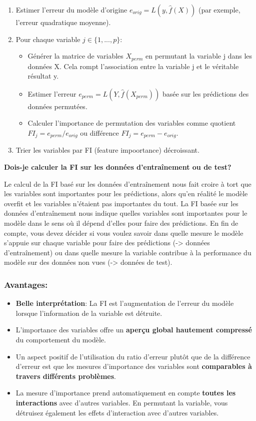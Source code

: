 \begin{enumerate}
    \item Estimer l'erreur du modèle d'origine $e_{orig} = L(y, \hat{f}(X))$  (par exemple, l'erreur quadratique moyenne).
    \item Pour chaque variable $j \in \{1,...,p\}$:
    \begin{itemize}
        \item Générer la matrice de variables $X_{perm}$ en permutant la variable j dans les données X. Cela rompt l'association entre la variable j et le véritable résultat y.
        \item Estimer l'erreur $e_{perm} = L(Y,\hat{f}(X_{perm}))$ basée sur les prédictions des données permutées.
        \item Calculer l'importance de permutation des variables comme quotient $FI_j= e_{perm}/e_{orig}$ ou différence $FI_j = e_{perm}- e_{orig}$.
    \end{itemize}
    \item Trier les variables par FI (feature impoortance) décroissant.
\end{enumerate}

\textbf{Dois-je calculer la FI sur les données d'entraînement ou de test?}

Le calcul de la FI basé sur les données d'entraînement nous fait croire à tort que les variables sont importantes pour les prédictions, alors qu'en réalité le modèle overfit et les variables n'étaient pas importantes du tout. La FI basée sur les données d'entraînement nous indique quelles variables sont importantes pour le modèle dans le sens où il dépend d'elles pour faire des prédictions.
En fin de compte, vous devez décider si vous voulez savoir dans quelle mesure le modèle s'appuie sur chaque variable pour faire des prédictions (-> données d'entraînement) ou dans quelle mesure la variable contribue à la performance du modèle sur des données non vues (-> données de test).

\subsubsection{Avantages:}
\begin{itemize}
    \item \textbf{Belle interprétation}: La FI est l'augmentation de l'erreur du modèle lorsque l'information de la variable est détruite.
    \item L'importance des variables offre un \textbf{aperçu global hautement compressé} du comportement du modèle.
    \item Un aspect positif de l'utilisation du ratio d'erreur plutôt que de la différence d'erreur est que les mesures d'importance des variables sont \textbf{comparables à travers différents problèmes}.
    \item La mesure d'importance prend automatiquement en compte \textbf{toutes les interactions} avec d'autres variables. En permutant la variable, vous détruisez également les effets d'interaction avec d'autres variables.
\end{itemize}

